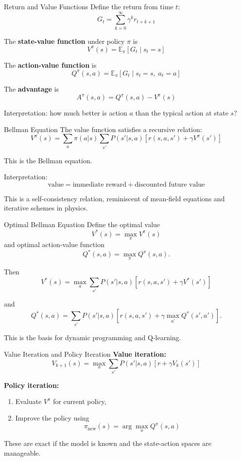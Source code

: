\documentclass[aspectratio=169]{beamer}
\begin{document}
\begin{frame}{Return and Value Functions}
  Define the return from time $t$:
  \[
  G_t = \sum_{k=0}^\infty \gamma^k r_{t+k+1}
  \]

  The \textbf{state-value function} under policy $\pi$ is
  \[
  V^\pi(s)=\mathbb{E}_\pi[G_t\mid s_t=s]
  \]

  The \textbf{action-value function} is
  \[
  Q^\pi(s,a)=\mathbb{E}_\pi[G_t\mid s_t=s,\; a_t=a]
  \]

  The \textbf{advantage} is
  \[
  A^\pi(s,a)=Q^\pi(s,a)-V^\pi(s)
  \]

  Interpretation: how much better is action $a$ than the typical action at state $s$?
\end{frame}

\begin{frame}{Bellman Equation}
  The value function satisfies a recursive relation:
  \[
  V^\pi(s)=\sum_a \pi(a|s)\sum_{s'} P(s'|s,a)
  \left[r(s,a,s')+\gamma V^\pi(s')\right]
  \]

  This is the Bellman equation.

  Interpretation:
  \[
  \text{value} = \text{immediate reward} + \text{discounted future value}
  \]

  This is a self-consistency relation, reminiscent of mean-field equations and iterative schemes in physics.
\end{frame}

\begin{frame}{Optimal Bellman Equation}
  Define the optimal value
  \[
  V^*(s)=\max_\pi V^\pi(s)
  \]
  and optimal action-value function
  \[
  Q^*(s,a)=\max_\pi Q^\pi(s,a).
  \]

  Then
  \[
  V^*(s)=\max_a \sum_{s'} P(s'|s,a)
  \left[r(s,a,s')+\gamma V^*(s')\right]
  \]

  and
  \[
  Q^*(s,a)=\sum_{s'} P(s'|s,a)
  \left[r(s,a,s')+\gamma \max_{a'}Q^*(s',a')\right].
  \]

  This is the basis for dynamic programming and Q-learning.
\end{frame}

\begin{frame}{Value Iteration and Policy Iteration}
  \textbf{Value iteration:}
  \[
  V_{k+1}(s)=\max_a \sum_{s'} P(s'|s,a)\left[r+\gamma V_k(s')\right]
  \]

  \textbf{Policy iteration:}
  \begin{enumerate}
  \item Evaluate $V^\pi$ for current policy,
  \item Improve the policy using
    \[
    \pi_{\text{new}}(s)=\arg\max_a Q^\pi(s,a)
    \]
  \end{enumerate}

  These are exact if the model is known and the state-action spaces are manageable.
\end{frame}
\end{document}
